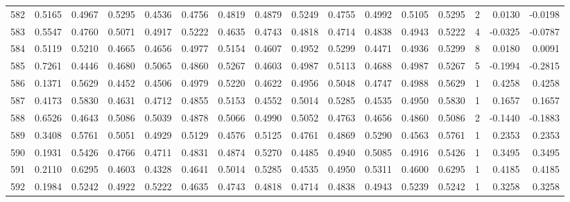\begin{tabular}{lrrrrrrrrrrrrrrr}
582 &      0.5165 &  0.4967 &  0.5295 &  0.4536 &  0.4756 &  0.4819 &  0.4879 &  0.5249 &  0.4755 &  0.4992 &   0.5105 &     0.5295 &      2 &                    0.0130 &                    -0.0198 \\
583 &      0.5547 &  0.4760 &  0.5071 &  0.4917 &  0.5222 &  0.4635 &  0.4743 &  0.4818 &  0.4714 &  0.4838 &   0.4943 &     0.5222 &      4 &                   -0.0325 &                    -0.0787 \\
584 &      0.5119 &  0.5210 &  0.4665 &  0.4656 &  0.4977 &  0.5154 &  0.4607 &  0.4952 &  0.5299 &  0.4471 &   0.4936 &     0.5299 &      8 &                    0.0180 &                     0.0091 \\
585 &      0.7261 &  0.4446 &  0.4680 &  0.5065 &  0.4860 &  0.5267 &  0.4603 &  0.4987 &  0.5113 &  0.4688 &   0.4987 &     0.5267 &      5 &                   -0.1994 &                    -0.2815 \\
586 &      0.1371 &  0.5629 &  0.4452 &  0.4506 &  0.4979 &  0.5220 &  0.4622 &  0.4956 &  0.5048 &  0.4747 &   0.4988 &     0.5629 &      1 &                    0.4258 &                     0.4258 \\
587 &      0.4173 &  0.5830 &  0.4631 &  0.4712 &  0.4855 &  0.5153 &  0.4552 &  0.5014 &  0.5285 &  0.4535 &   0.4950 &     0.5830 &      1 &                    0.1657 &                     0.1657 \\
588 &      0.6526 &  0.4643 &  0.5086 &  0.5039 &  0.4878 &  0.5066 &  0.4990 &  0.5052 &  0.4763 &  0.4656 &   0.4860 &     0.5086 &      2 &                   -0.1440 &                    -0.1883 \\
589 &      0.3408 &  0.5761 &  0.5051 &  0.4929 &  0.5129 &  0.4576 &  0.5125 &  0.4761 &  0.4869 &  0.5290 &   0.4563 &     0.5761 &      1 &                    0.2353 &                     0.2353 \\
590 &      0.1931 &  0.5426 &  0.4766 &  0.4711 &  0.4831 &  0.4874 &  0.5270 &  0.4485 &  0.4940 &  0.5085 &   0.4916 &     0.5426 &      1 &                    0.3495 &                     0.3495 \\
591 &      0.2110 &  0.6295 &  0.4603 &  0.4328 &  0.4641 &  0.5014 &  0.5285 &  0.4535 &  0.4950 &  0.5311 &   0.4600 &     0.6295 &      1 &                    0.4185 &                     0.4185 \\
592 &      0.1984 &  0.5242 &  0.4922 &  0.5222 &  0.4635 &  0.4743 &  0.4818 &  0.4714 &  0.4838 &  0.4943 &   0.5239 &     0.5242 &      1 &                    0.3258 &                     0.3258 \\

\end{tabular}
